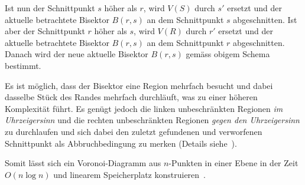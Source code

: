 Ist nun der Schnittpunkt $s$ höher als $r$, wird $V(S)$ durch $s'$ ersetzt und der aktuelle betrachtete Bisektor $B(r,s)$ an dem Schnittpunkt $s$ abgeschnitten.
Ist aber der Schnittpunkt $r$ höher als $s$, wird $V(R)$ durch $r'$ ersetzt und der aktuelle betrachtete Bisektor $B(r,s)$ an dem Schnittpunkt $r$ abgeschnitten.
Danach wird der neue aktuelle Bisektor $B(r,s)$ gemäss obigem Schema bestimmt.

Es ist möglich, dass der Bisektor eine Region mehrfach besucht und dabei dasselbe Stück des Randes mehrfach durchläuft, was zu einer höheren Komplexität führt. Es genügt jedoch die linken unbeschränkten Regionen \textit{im Uhrzeigersinn} und die rechten unbeschränkten Regionen \textit{gegen den Uhrzeigersinn} zu durchlaufen und sich dabei den zuletzt gefundenen und verworfenen Schnittpunkt als Abbruchbedingung zu merken (Details siehe~\cite[S. 301]{klein2005algorithmischegeometrie}).

Somit lässt sich ein Voronoi-Diagramm aus $n$-Punkten in einer Ebene in der Zeit $O(n \log{n})$ und linearem Speicherplatz konstruieren~\parencite[S. 299 bis 302]{klein2005algorithmischegeometrie}.
